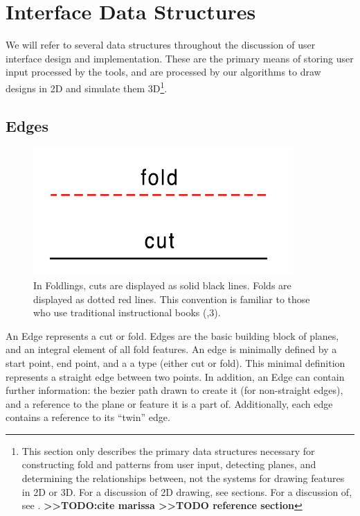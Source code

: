 \section{Interface Data Structures}\label{interface-data-structures}

We will refer to several data structures throughout the discussion of
user interface design and implementation. These are the primary means of
storing user input processed by the tools, and are processed by our
algorithms to draw designs in 2D and simulate them 3D\footnote{This
  section only describes the primary data structures necessary for
  constructing fold and patterns from user input, detecting planes, and
  determining the relationships between, not the systems for drawing
  features in 2D or 3D. For a discussion of 2D drawing, see sections.
  For a discussion of, see .
  \textbf{\textgreater{}\textgreater{}TODO:cite marissa
  \textgreater{}\textgreater{}TODO reference section}}.

\subsection{Edges}\label{edges}

\begin{figure}[htbp]
\centering
\includegraphics{figures/33_UI_Interface_Data_Structures/foldvsedge.pdf}
\caption{In Foldlings, cuts are displayed as solid black lines. Folds
are displayed as dotted red lines. This convention is familiar to those
who use traditional instructional books
(\citet{berenson1972kirigami},3).}
\end{figure}

An Edge represents a cut or fold. Edges are the basic building block of
planes, and an integral element of all fold features. An edge is
minimally defined by a start point, end point, and a a type (either cut
or fold). This minimal definition represents a straight edge between two
points. In addition, an Edge can contain further information: the bezier
path drawn to create it (for non-straight edges), and a reference to the
plane or feature it is a part of. Additionally, each edge contains a
reference to its ``twin'' edge.

